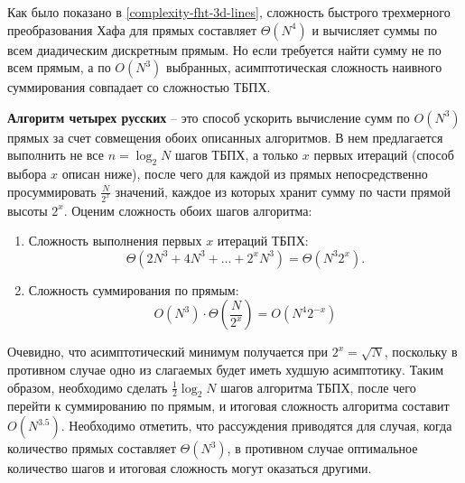 
Как было показано в \eqref{complexity-fht-3d-lines}, сложность быстрого трехмерного преобразования Хафа для прямых составляет $\Theta(N^4)$ и вычисляет суммы по всем диадическим дискретным прямым. Но если требуется найти сумму не по всем прямым, а по $O(N^3)$ выбранных, асимптотическая сложность наивного суммирования совпадает со сложностью ТБПХ.

\textbf{Алгоритм четырех русских} -- это способ ускорить вычисление сумм по $O(N^3)$ прямых за счет совмещения обоих описанных алгоритмов. В нем предлагается выполнить не все $n = \log_2 N$ шагов ТБПХ, а только $x$ первых итераций (способ выбора $x$ описан ниже), после чего для каждой из прямых непосредственно просуммировать $\frac{N}{2^x}$ значений, каждое из которых хранит сумму по части прямой высоты $2^x$. Оценим сложность обоих шагов алгоритма:
\begin{enumerate}
\item
    Сложность выполнения первых $x$ итераций ТБПХ:
    \begin{equation*}
        \Theta\left( 2N^3 + 4N^3 + \dots + 2^x N^3 \right) =
        \Theta\left( N^3 2^{x} \right).
    \end{equation*}
\item
    Сложность суммирования по прямым:
    \begin{equation*}
        O(N^3) \cdot \Theta\left( \frac{N}{2^x} \right) =
        O\left( N^4 2^{-x} \right)
    \end{equation*}
\end{enumerate}

Очевидно, что асимптотический минимум получается при $2^x = \sqrt{N}$, поскольку в противном случае одно из слагаемых будет иметь худшую асимптотику. Таким образом, необходимо сделать $\frac{1}{2} \log_2 N$ шагов алгоритма ТБПХ, после чего перейти к суммированию по прямым, и итоговая сложность алгоритма составит $O\left( N^{3.5} \right)$.
Необходимо отметить, что рассуждения приводятся для случая, когда количество прямых составляет $\Theta(N^3)$, в противном случае оптимальное количество шагов и итоговая сложность могут оказаться другими.
